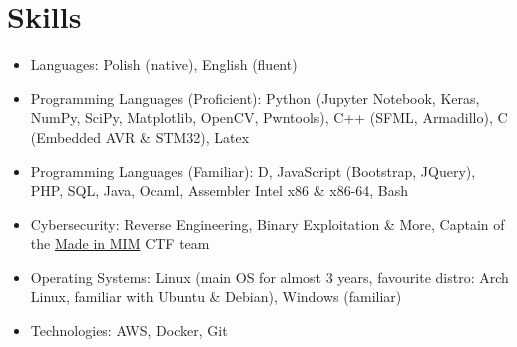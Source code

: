 \section{\sc Skills}
\begin{itemize}[leftmargin=0.16cm]
\setlength\itemsep{0em}
\item Languages: Polish (native), English (fluent)
\item Programming Languages (Proficient): Python (Jupyter Notebook, Keras, NumPy, SciPy, Matplotlib, OpenCV, Pwntools), C++ (SFML, Armadillo), C (Embedded AVR \& STM32), Latex 
\item Programming Languages (Familiar): D, JavaScript (Bootstrap, JQuery), PHP, SQL, Java, Ocaml, Assembler Intel x86 \& x86-64, Bash
\item Cybersecurity: Reverse Engineering, Binary Exploitation \& More, Captain of the \href{https://ctftime.org/team/48557}{Made in MIM} CTF team
\item Operating Systems: Linux (main OS for almost 3 years, favourite distro: Arch Linux, familiar with Ubuntu \& Debian), Windows (familiar)
\item Technologies: AWS, Docker, Git
\end{itemize}
